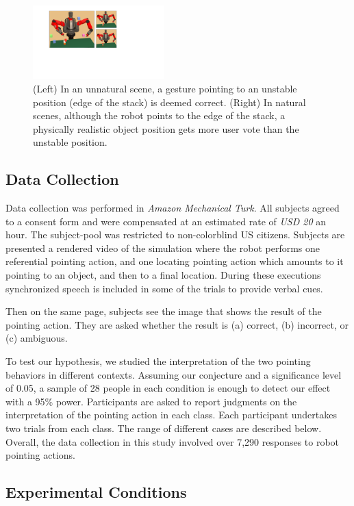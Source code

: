 \begin{figure}[t]
    \centering
    \includegraphics[width=0.45\textwidth]{natural.pdf}
    \caption{(Left) In an unnatural scene, a gesture pointing to an unstable position (edge of the stack) is deemed correct. (Right) In natural scenes, although the robot points to the edge of the stack, a physically realistic object position gets more user vote than the unstable position.}
    \label{fig:natural}
\end{figure}

\subsection{Data Collection}

Data collection was performed in \textit{Amazon Mechanical Turk}. All subjects agreed to a consent form and were compensated at an estimated rate of \textit{USD 20} an hour. The subject-pool was restricted to non-colorblind US citizens. Subjects are presented a rendered video of the simulation where the robot performs one referential pointing action, and one locating pointing action which amounts to it pointing to an object, and then to a final location. During these executions synchronized speech is included in some of the trials to provide verbal cues.

Then on the same page, subjects see the image that shows the result of the pointing action. They are asked whether the result is (a) correct, (b) incorrect, or (c) ambiguous.  

To test our hypothesis, we studied the interpretation of the two pointing behaviors in different contexts. Assuming our conjecture and a significance level of 0.05, a sample of 28 people in each condition is enough to detect our effect with a 95\% power.  Participants are asked to report judgments on the interpretation of the pointing action in each class.  Each participant undertakes two trials from each class.  The range of different cases are described below.  Overall, the data collection in this study involved over 7,290 responses to robot pointing actions.

\subsection{Experimental Conditions}

